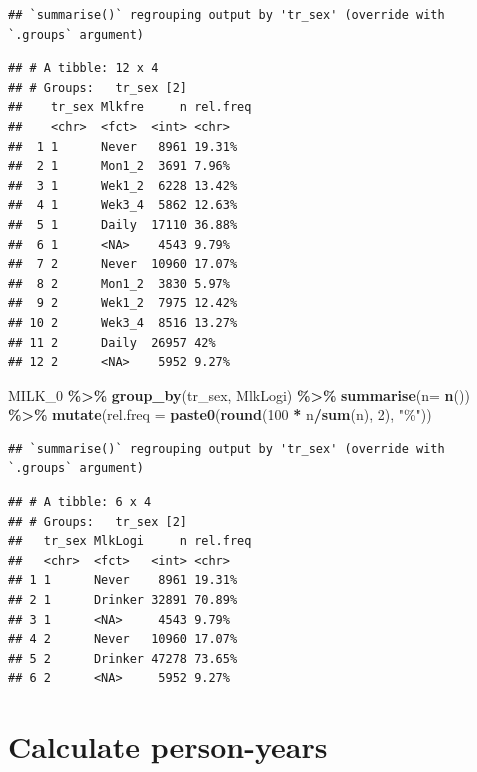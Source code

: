\documentclass[
]{article}
\newenvironment{Shaded}{\begin{snugshade}}{\end{snugshade}}
\newcommand{\DataTypeTok}[1]{\textcolor[rgb]{0.13,0.29,0.53}{#1}}
\newcommand{\DecValTok}[1]{\textcolor[rgb]{0.00,0.00,0.81}{#1}}
\newcommand{\KeywordTok}[1]{\textcolor[rgb]{0.13,0.29,0.53}{\textbf{#1}}}
\newcommand{\NormalTok}[1]{#1}
\newcommand{\OperatorTok}[1]{\textcolor[rgb]{0.81,0.36,0.00}{\textbf{#1}}}
\newcommand{\StringTok}[1]{\textcolor[rgb]{0.31,0.60,0.02}{#1}}
\begin{document}
\begin{verbatim}
## `summarise()` regrouping output by 'tr_sex' (override with `.groups` argument)
\end{verbatim}

\begin{verbatim}
## # A tibble: 12 x 4
## # Groups:   tr_sex [2]
##    tr_sex Mlkfre     n rel.freq
##    <chr>  <fct>  <int> <chr>   
##  1 1      Never   8961 19.31%  
##  2 1      Mon1_2  3691 7.96%   
##  3 1      Wek1_2  6228 13.42%  
##  4 1      Wek3_4  5862 12.63%  
##  5 1      Daily  17110 36.88%  
##  6 1      <NA>    4543 9.79%   
##  7 2      Never  10960 17.07%  
##  8 2      Mon1_2  3830 5.97%   
##  9 2      Wek1_2  7975 12.42%  
## 10 2      Wek3_4  8516 13.27%  
## 11 2      Daily  26957 42%     
## 12 2      <NA>    5952 9.27%
\end{verbatim}

\begin{Shaded}
\begin{Highlighting}[]
\NormalTok{MILK\_}\DecValTok{0} \OperatorTok{\%\textgreater{}\%}\StringTok{ }
\StringTok{  }\KeywordTok{group\_by}\NormalTok{(tr\_sex, MlkLogi) }\OperatorTok{\%\textgreater{}\%}
\StringTok{  }\KeywordTok{summarise}\NormalTok{(}\DataTypeTok{n=} \KeywordTok{n}\NormalTok{()) }\OperatorTok{\%\textgreater{}\%}
\StringTok{  }\KeywordTok{mutate}\NormalTok{(}\DataTypeTok{rel.freq =} \KeywordTok{paste0}\NormalTok{(}\KeywordTok{round}\NormalTok{(}\DecValTok{100} \OperatorTok{*}\StringTok{ }\NormalTok{n}\OperatorTok{/}\KeywordTok{sum}\NormalTok{(n), }\DecValTok{2}\NormalTok{), }\StringTok{"\%"}\NormalTok{))}
\end{Highlighting}
\end{Shaded}

\begin{verbatim}
## `summarise()` regrouping output by 'tr_sex' (override with `.groups` argument)
\end{verbatim}

\begin{verbatim}
## # A tibble: 6 x 4
## # Groups:   tr_sex [2]
##   tr_sex MlkLogi     n rel.freq
##   <chr>  <fct>   <int> <chr>   
## 1 1      Never    8961 19.31%  
## 2 1      Drinker 32891 70.89%  
## 3 1      <NA>     4543 9.79%   
## 4 2      Never   10960 17.07%  
## 5 2      Drinker 47278 73.65%  
## 6 2      <NA>     5952 9.27%
\end{verbatim}

\hypertarget{calculate-person-years}{%
\section{Calculate person-years}\label{calculate-person-years}}
\end{document}
